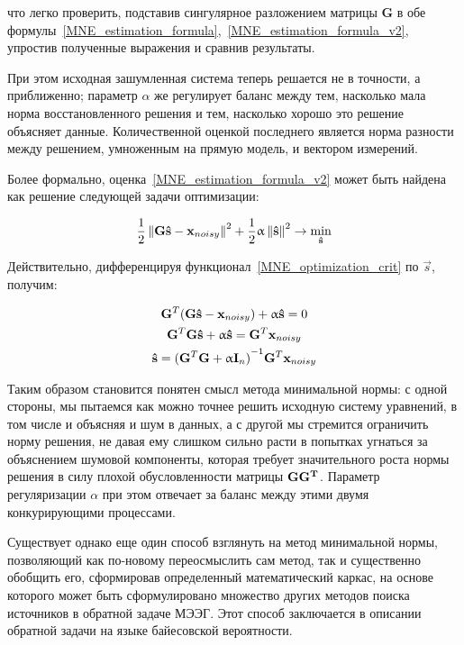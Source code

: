 что легко проверить, подставив сингулярное разложением матрицы $\mathbf{G}$ в
обе формулы~\ref{MNE_estimation_formula},~\ref{MNE_estimation_formula_v2},
упростив полученные выражения и сравнив результаты.

При этом исходная зашумленная система теперь решается не в точности, а
приближенно; параметр $\alpha$ же регулирует баланс между
тем, насколько мала норма восстановленного решения и тем, насколько
хорошо это решение объясняет данные. Количественной оценкой последнего
является норма разности между решением, умноженным на прямую модель,
и вектором измерений.

Более формально, оценка~\ref{MNE_estimation_formula_v2} может быть найдена
как решение следующей задачи оптимизации:

\begin{equation}
    \frac{1}{2}\left\lVert\mathbf{G\hat{s} - x}_{noisy}\right\rVert^2 + \frac{1}{2}\upalpha\left\lVert\mathbf{\hat{s}}\right\rVert^2 \rightarrow \underset{\mathbf{\hat{s}}}{\min}
    \label{MNE_optimization_crit}
\end{equation}

Действительно, дифференцируя функционал~\ref{MNE_optimization_crit} по $\vec{s}$,
получим:

\begin{gather*}
    \mathbf{G}^T(\mathbf{G}\mathbf{\hat{s}} - \mathbf{x}_{noisy}) + \upalpha\mathbf{\hat{s}} = 0\\
    \mathbf{G}^T\mathbf{G}\mathbf{\hat{s}} + \upalpha \mathbf{\hat{s}} = \mathbf{G}^T\mathbf{x}_{noisy}\\
    \mathbf{\hat{s}} = {(\mathbf{G}^T\mathbf{G} + \upalpha \mathbf{I}_n)}^{-1}\mathbf{G}^T\mathbf{x}_{noisy}
\end{gather*}


Таким образом становится понятен смысл метода минимальной нормы: с одной
стороны, мы пытаемся как можно точнее решить исходную систему уравнений, в
том числе и объясняя и шум в данных, а с другой мы стремится ограничить норму
решения, не давая ему слишком сильно расти в попытках угнаться за объяснением
шумовой компоненты, которая требует значительного роста нормы решения в силу
плохой обусловленности матрицы $\mathbf{GG^T}$. Параметр регуляризации $\alpha$
при этом отвечает за баланс между этими двумя конкурирующими процессами.

Существует однако еще один способ взглянуть на метод минимальной нормы,
позволяющий как по-новому переосмыслить сам метод, так и существенно обобщить
его, сформировав определенный математический каркас, на основе которого
может быть сформулировано множество других методов поиска источников
в обратной задаче МЭЭГ. Этот способ заключается в описании обратной задачи
на языке байесовской вероятности.

